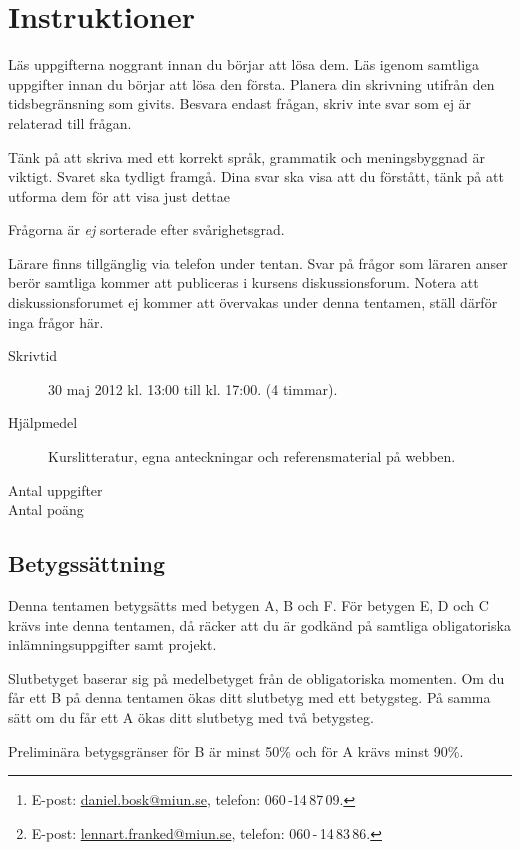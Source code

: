 \documentclass[a4paper,11pt,addpoints]{miunexam}
\author{%
	Daniel Bosk\footnote{%
		E-post: \protect\url{daniel.bosk@miun.se},
		telefon: 060\,-14\,87\,09.
	} och
	Lennart Franked\footnote{%
		E-post: \protect\url{lennart.franked@miun.se},
		telefon: 060\,-\,14\,83\,86.
	}
}
\date{2012-08-28}
\begin{document}
\maketitle
\thispagestyle{foot}

\section*{Instruktioner}
\noindent
Läs uppgifterna noggrant innan du börjar att lösa dem.
Läs igenom samtliga uppgifter innan du börjar att lösa den första.
Planera din skrivning utifrån den tidsbegränsning som givits.
Besvara endast frågan, skriv inte svar som ej är relaterad till frågan.

Tänk på att skriva med ett korrekt språk, grammatik och meningsbyggnad är 
viktigt.
Svaret ska tydligt framgå.
Dina svar ska visa att du förstått, tänk på att utforma dem för att visa just 
dettae

Frågorna är \emph{ej} sorterade efter svårighetsgrad.

Lärare finns tillgänglig via telefon under tentan.
Svar på frågor som läraren anser berör samtliga kommer att publiceras i kursens
diskussionsforum.
Notera att diskussionsforumet ej kommer att övervakas under denna tentamen, 
ställ därför inga frågor här.

\begin{description}
	\item[Skrivtid] 30 maj 2012 kl. 13:00 till kl. 17:00.
		(4 timmar).
	\item[Hjälpmedel] Kurslitteratur, egna anteckningar och referensmaterial på
		webben.
	\item[Antal uppgifter] \numquestions
	\item[Antal poäng] \numpoints
\end{description}


\subsection*{Betygssättning}
\noindent
Denna tentamen betygsätts med betygen A, B och F.
För betygen E, D och C krävs inte denna tentamen, då räcker att du är godkänd 
på samtliga obligatoriska inlämningsuppgifter samt projekt.

Slutbetyget baserar sig på medelbetyget från de obligatoriska momenten.
Om du får ett B på denna tentamen ökas ditt slutbetyg med ett betygsteg.
På samma sätt om du får ett A ökas ditt slutbetyg med två betygsteg.

Preliminära betygsgränser för B är minst \unit{50}{\%} och för A krävs minst 
\unit{90}{\%}.
\end{document}
